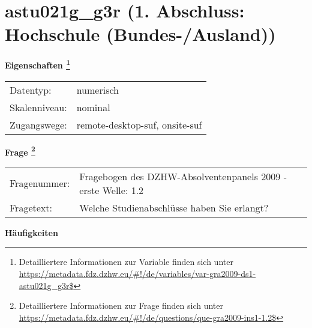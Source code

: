 
    \setcounter{footnote}{0}

    \vspace*{-1.8cm}
	\section{astu021g\_g3r (1. Abschluss: Hochschule (Bundes-/Ausland))}
	\label{section:astu021g_g3r}



    \vspace*{0.5cm}
    \noindent\textbf{Eigenschaften
	\footnote{Detailliertere Informationen zur Variable finden sich unter
		\url{https://metadata.fdz.dzhw.eu/\#!/de/variables/var-gra2009-ds1-astu021g_g3r$}}}\\
	\begin{tabularx}{\hsize}{@{}lX}
	Datentyp: & numerisch \\
	Skalenniveau: & nominal \\
	Zugangswege: &
	  remote-desktop-suf, 
	  onsite-suf
 \\
    \end{tabularx}



				\vspace*{0.5cm}
                \noindent\textbf{Frage
	                \footnote{Detailliertere Informationen zur Frage finden sich unter
		              \url{https://metadata.fdz.dzhw.eu/\#!/de/questions/que-gra2009-ins1-1.2$}}}\\
				\begin{tabularx}{\hsize}{@{}lX}
					Fragenummer: &
					  Fragebogen des DZHW-Absolventenpanels 2009 - erste Welle:
					  1.2
 \\
					Fragetext: & Welche Studienabschlüsse haben Sie erlangt? \\
				\end{tabularx}





        		\vspace*{0.5cm}
                \noindent\textbf{Häufigkeiten}

